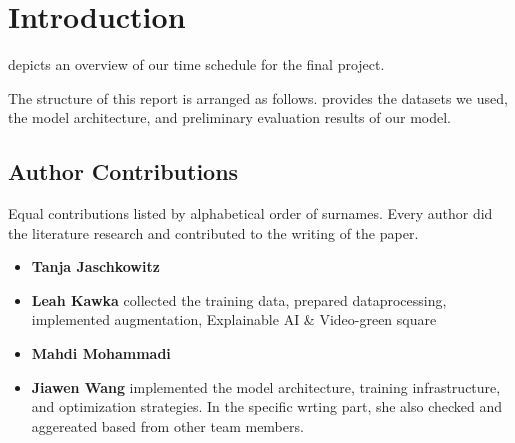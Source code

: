 \section{Introduction}
\label{sec:intro}

 depicts an overview of our time schedule for the final project. 

The structure of this report is arranged as follows. 
 provides the datasets we used, 
the model architecture, 
and preliminary evaluation results of our model. 

\renewcommand{\thesection}{\arabic{section}}

\subsection{Author Contributions}
\label{sec:author}
Equal contributions listed by alphabetical order of surnames. 
Every author did the literature research and contributed to the writing of the paper. 

\begin{itemize}
    \item \textbf{Tanja Jaschkowitz} 
    \item \textbf{Leah Kawka} collected the training data, prepared dataprocessing, implemented augmentation, Explainable AI \& Video-green square
    \item \textbf{Mahdi Mohammadi}
    \item \textbf{Jiawen Wang} implemented the model architecture, training infrastructure, and optimization strategies. 
    In the specific wrting part, she also checked and aggereated based from other team members.
\end{itemize}

